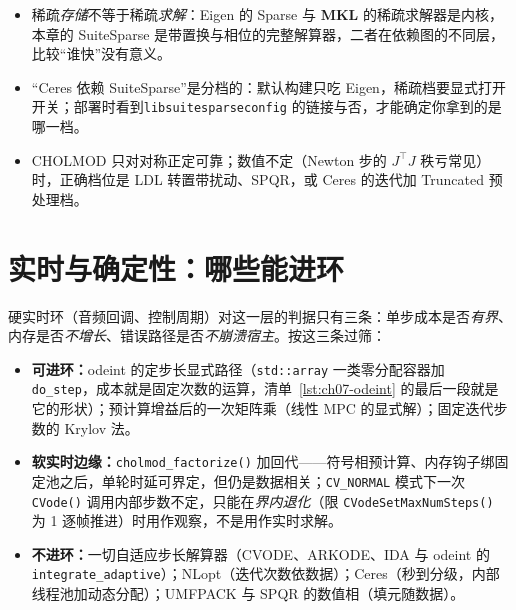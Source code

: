 \documentclass[12pt,a4paper,fontset=fandol]{ctexbook}
\newcommand{\Fn}[1]{\texttt{#1()}}
\newcommand{\Tp}[1]{\texttt{#1}}
\newcommand{\Bk}{\allowbreak}
\newcommand{\Lib}[1]{\textbf{#1}}
\begin{document}
\begin{warning}[title={``稀疏一词的两处歧义}]
\begin{itemize}
\item 稀疏\emph{存储}不等于稀疏\emph{求解}：Eigen 的 Sparse 与 \Lib{MKL} 的稀疏求解器是内核，本章的 SuiteSparse 是带置换与相位的完整解算器，二者在依赖图的不同层，比较``谁快''没有意义。
\item ``Ceres 依赖 SuiteSparse''是分档的：默认构建只吃 Eigen，稀疏档要显式打开开关；部署时看到\Tp{libsuitesparseconfig} 的链接与否，才能确定你拿到的是哪一档。
\item CHOLMOD 只对对称正定可靠；数值不定（Newton 步的 $J^{\top}J$ 秩亏常见）时，正确档位是 LDL 转置带扰动、SPQR，或 Ceres 的迭代加 Truncated 预处理档。
\end{itemize}
\end{warning}

\section{实时与确定性：哪些能进环}\label{sec:ch07-rt}

硬实时环（音频回调、控制周期）对这一层的判据只有三条：单步成本是否\emph{有界}、内存是否\emph{不增长}、错误路径是否\emph{不崩溃宿主}。按这三条过筛：

\begin{itemize}
\item \textbf{可进环：}odeint 的定步长显式路径（\Tp{std::array} 一类零分配容器加 \Tp{do\_step}，成本就是固定次数的运算，清单~\ref{lst:ch07-odeint} 的最后一段就是它的形状）；预计算增益后的一次矩阵乘（线性 MPC 的显式解）；固定迭代步数的 Krylov 法。
\item \textbf{软实时边缘：}\Fn{cholmod\_{\Bk}factorize} 加回代——符号相预计算、内存钩子绑固定池之后，单轮时延可界定，但仍是数据相关；\Tp{CV\_NORMAL} 模式下一次 \Fn{CVode} 调用内部步数不定，只能在\emph{界内退化}（限 \Fn{CVode{\Bk}Set{\Bk}Max{\Bk}Num{\Bk}Steps} 为 1 逐帧推进）时用作观察，不是用作实时求解。\item \textbf{不进环：}一切自适应步长解算器（CVODE、ARKODE、IDA 与 odeint 的 \Tp{integrate\_{\Bk}adaptive}）；NLopt（迭代次数依数据）；Ceres（秒到分级，内部线程池加动态分配）；UMFPACK 与 SPQR 的数值相（填元随数据）。
\end{itemize}
\end{document}
